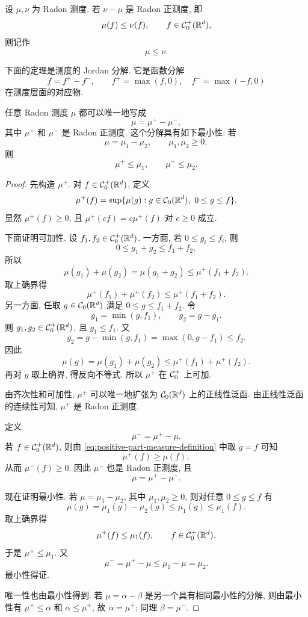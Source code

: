 \begin{defn}[测度的序]
	\label{def:order-of-radon-measures}
	设 \(\mu,\nu\) 为 Radon 测度. 若 \(\nu-\mu\) 是 Radon 正测度, 即
	\[
	\mu(f)\leq \nu(f),
	\qquad f\in\mathcal{C}_0^+(\mathbb{R}^d),
	\]
	则记作
	\[
	\mu\leq \nu.
	\]
\end{defn}

下面的定理是测度的 Jordan 分解. 它是函数分解
\[
f=f^+-f^-,
\qquad
f^+=\max(f,0),
\quad
f^-=\max(-f,0)
\]
在测度层面的对应物.

\begin{thm}[Jordan 分解]
	\label{thm:jordan-decomposition-radon-measure}
	任意 Radon 测度 \(\mu\) 都可以唯一地写成
	\[
	\mu=\mu^+-\mu^-,
	\]
	其中 \(\mu^+\) 和 \(\mu^-\) 是 Radon 正测度. 这个分解具有如下最小性: 若
	\[
	\mu=\mu_1-\mu_2,
	\qquad \mu_1,\mu_2\geq0,
	\]
	则
	\[
	\mu^+\leq \mu_1,
	\qquad
	\mu^-\leq \mu_2.
	\]
\end{thm}

\begin{proof}
	先构造 \(\mu^+\). 对 \(f\in\mathcal{C}_0^+(\mathbb{R}^d)\), 定义
	\begin{equation}
		\mu^+(f)=\sup\{\mu(g):g\in\mathcal{C}_0(\mathbb{R}^d),\ 0\leq g\leq f\}.
		\label{eq:positive-part-measure-definition}
	\end{equation}
	显然 \(\mu^+(f)\geq0\), 且 \(\mu^+(cf)=c\mu^+(f)\) 对 \(c\geq0\) 成立.
	
	下面证明可加性. 设 \(f_1,f_2\in\mathcal{C}_0^+(\mathbb{R}^d)\). 一方面, 若 \(0\leq g_i\leq f_i\), 则
	\[
	0\leq g_1+g_2\leq f_1+f_2,
	\]
	所以
	\[
	\mu(g_1)+\mu(g_2)=\mu(g_1+g_2)\leq \mu^+(f_1+f_2).
	\]
	取上确界得
	\[
	\mu^+(f_1)+\mu^+(f_2)\leq \mu^+(f_1+f_2).
	\]
	另一方面, 任取 \(g\in\mathcal{C}_0(\mathbb{R}^d)\) 满足 \(0\leq g\leq f_1+f_2\). 令
	\[
	g_1=\min(g,f_1),
	\qquad
	g_2=g-g_1.
	\]
	则 \(g_1,g_2\in\mathcal{C}_0^+(\mathbb{R}^d)\), 且 \(g_1\leq f_1\). 又
	\[
	g_2=g-\min(g,f_1)=\max(0,g-f_1)\leq f_2.
	\]
	因此
	\[
	\mu(g)=\mu(g_1)+\mu(g_2)\leq \mu^+(f_1)+\mu^+(f_2).
	\]
	再对 \(g\) 取上确界, 得反向不等式. 所以 \(\mu^+\) 在 \(\mathcal{C}_0^+\) 上可加.
	
	由齐次性和可加性, \(\mu^+\) 可以唯一地扩张为 \(\mathcal{C}_0(\mathbb{R}^d)\) 上的正线性泛函. 由正线性泛函的连续性可知, \(\mu^+\) 是 Radon 正测度.
	
	定义
	\[
	\mu^-=\mu^+-\mu.
	\]
	若 \(f\in\mathcal{C}_0^+(\mathbb{R}^d)\), 则由 \eqref{eq:positive-part-measure-definition} 中取 \(g=f\) 可知
	\[
	\mu^+(f)\geq \mu(f),
	\]
	从而 \(\mu^-(f)\geq0\). 因此 \(\mu^-\) 也是 Radon 正测度, 且
	\[
	\mu=\mu^+-\mu^-.
	\]
	
	现在证明最小性. 若 \(\mu=\mu_1-\mu_2\), 其中 \(\mu_1,\mu_2\geq0\), 则对任意 \(0\leq g\leq f\) 有
	\[
	\mu(g)=\mu_1(g)-\mu_2(g)\leq \mu_1(g)\leq \mu_1(f).
	\]
	取上确界得
	\[
	\mu^+(f)\leq \mu_1(f),
	\qquad f\in\mathcal{C}_0^+(\mathbb{R}^d).
	\]
	于是 \(\mu^+\leq\mu_1\). 又
	\[
	\mu^-=\mu^+-\mu\leq \mu_1-\mu=\mu_2.
	\]
	最小性得证.
	
	唯一性也由最小性得到. 若 \(\mu=\alpha-\beta\) 是另一个具有相同最小性的分解, 则由最小性有 \(\mu^+\leq\alpha\) 和 \(\alpha\leq\mu^+\), 故 \(\alpha=\mu^+\); 同理 \(\beta=\mu^-\).
\end{proof}

